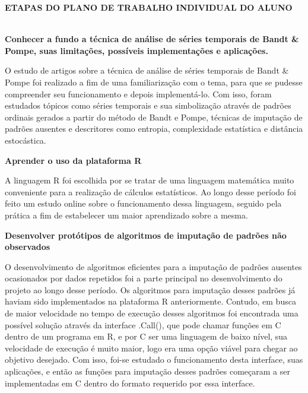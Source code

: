 \documentclass{article}
\begin{document}
\newpage
\begin{center}
\textbf{\large{ETAPAS DO PLANO DE TRABALHO INDIVIDUAL DO ALUNO}}\\
\hrulefill \\
\end{center}

\begin{flushleft}    
\textbf{Conhecer a fundo a técnica de análise de séries temporais de Bandt \& Pompe, suas limitações, possíveis implementações e aplicações.}
\end{flushleft}

O estudo de artigos sobre a técnica de análise de séries temporais de Bandt \& Pompe foi realizado a fim de uma familiarização com o tema, para que se pudesse compreender seu funcionamento e depois implementá-lo.
Com isso, foram estudados tópicos como séries temporais e sua simbolização através de padrões ordinais gerados a partir do método de Bandt e Pompe, técnicas de imputação de padrões ausentes e descritores como entropia, complexidade estatística e distância estocástica.\\

\begin{flushleft}
\textbf{Aprender o uso da plataforma R}
\end{flushleft}


A linguagem R foi escolhida por se tratar de uma linguagem matemática muito conveniente para a realização de cálculos estatísticos. Ao longo desse período foi feito um estudo online sobre o funcionamento dessa linguagem, seguido pela prática a fim de estabelecer um maior aprendizado sobre a mesma.\\

\begin{flushleft}
\textbf{Desenvolver protótipos de algoritmos de imputação de padrões não observados}
\end{flushleft}


O desenvolvimento de algoritmos eficientes para a imputação de padrões ausentes ocasionados por dados repetidos foi a parte principal no desenvolvimento do projeto ao longo desse período. 
Os algoritmos para imputação desses padrões já haviam sido implementados na plataforma R anteriormente. Contudo, em busca de maior velocidade no tempo de execução desses algoritmos foi encontrada uma possível solução através da interface .Call()\cite{Speed}, que pode chamar funções em C dentro de um programa em R, e por C ser uma linguagem de baixo nível, sua velocidade de execução é muito maior, logo era uma opção viável para chegar ao objetivo desejado.
Com isso, foi-se estudado o funcionamento desta interface, suas aplicações, e então as funções para imputação desses padrões começaram a ser implementadas em C dentro do formato requerido por essa interface.\\
\end{document}

